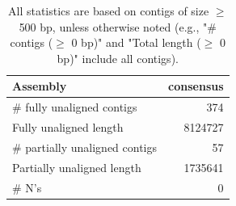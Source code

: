 \documentclass[12pt,a4paper]{article}
\begin{document}
\begin{table}[ht]
\begin{center}
\caption{All statistics are based on contigs of size $\geq$ 500 bp, unless otherwise noted (e.g., "\# contigs ($\geq$ 0 bp)" and "Total length ($\geq$ 0 bp)" include all contigs).}
\begin{tabular}{|l*{1}{|r}|}
\hline
Assembly & consensus \\ \hline
\# fully unaligned contigs & 374 \\ \hline
Fully unaligned length & 8124727 \\ \hline
\# partially unaligned contigs & 57 \\ \hline
Partially unaligned length & 1735641 \\ \hline
\# N's & 0 \\ \hline
\end{tabular}
\end{center}
\end{table}
\end{document}
